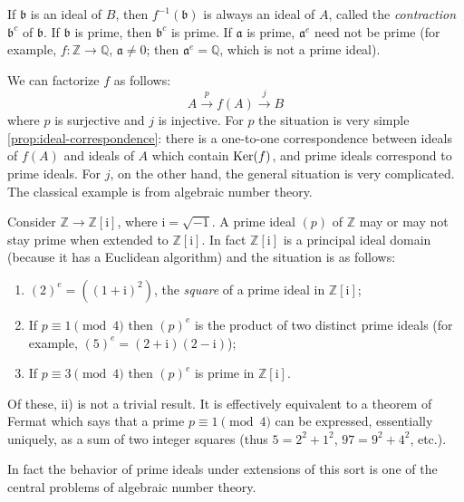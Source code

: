 If $\mathfrak{b}$ is an ideal of $B$, then $f^{-1}(\mathfrak{b})$ is always an ideal of $A$, called the \emph{contraction} $\mathfrak{b}^c$ of $\mathfrak{b}$. If $\mathfrak{b}$ is prime, then $\mathfrak{b}^c$ is prime. If $\mathfrak{a}$ is prime, $\mathfrak{a}^e$ need not be prime (for example, $f \colon \mathbb{Z} \to \mathbb{Q}$, $\mathfrak{a} \neq 0$; then $\mathfrak{a}^e = \mathbb{Q}$, which is not a prime ideal).

We can factorize $f$ as follows:
\[
A \stackrel{p}{\longrightarrow} f(A) \stackrel{j}{\longrightarrow} B
\]
where $p$ is surjective and $j$ is injective. For $p$ the situation is very simple \eqref{prop:ideal-correspondence}: there is a one-to-one correspondence between ideals of $f(A)$ and ideals of $A$ which contain $\operatorname{Ker}(f)$, and prime ideals correspond to prime ideals. For $j$, on the other hand, the general situation is very complicated. The classical example is from algebraic number theory.

\begin{example}
    Consider $\mathbb{Z} \to \mathbb{Z}[\mathrm{i}]$, where $\mathrm{i} = \sqrt{-1}$. A prime ideal $(p)$ of $\mathbb{Z}$ may or may not stay prime when extended to $\mathbb{Z}[\mathrm{i}]$. In fact $\mathbb{Z}[\mathrm{i}]$ is a principal ideal domain (because it has a Euclidean algorithm) and the situation is as follows:

    \begin{enumerate}
        \item[i)] $(2)^e = ((1+\mathrm{i})^2)$, the \emph{square} of a prime ideal in $\mathbb{Z}[\mathrm{i}]$;
        \item[ii)] If $p \equiv 1 \pmod 4$ then $(p)^e$ is the product of two distinct prime ideals (for example, $(5)^e = (2+\mathrm{i})(2-\mathrm{i})$);
        \item[iii)] If $p \equiv 3 \pmod 4$ then $(p)^e$ is prime in $\mathbb{Z}[\mathrm{i}]$.
    \end{enumerate}

    Of these, ii) is not a trivial result. It is effectively equivalent to a theorem of Fermat which says that a prime $p \equiv 1 \pmod 4$ can be expressed, essentially uniquely, as a sum of two integer squares (thus $5 = 2^2 + 1^2$, $97 = 9^2 + 4^2$, etc.).
\end{example}

In fact the behavior of prime ideals under extensions of this sort is one of the central problems of algebraic number theory.

